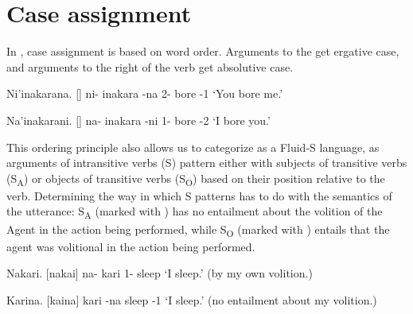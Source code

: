 \section{Case assignment}
	In \kurango , case assignment is based on word order. Arguments to the get ergative case, and arguments to the right of the verb get absolutive case.

	\begin{example}
	\label{ex:case_wordorder_1}
		Ni'inakarana. []
		\gll ni- inakara -na
		2- bore -1
		\glt `You bore me.'
		\glend
	\end{example}

	\begin{example}
	\label{ex:case_wordorder_2}
		Na'inakarani. [\textipa{naPinakaRani}]
		\gll na- inakara -ni
		1- bore -2
		\glt `I bore you.'
		\glend
	\end{example}

	This ordering principle also allows us to categorize {\kurango} as a Fluid-S language, as arguments of intransitive verbs (S) pattern either with subjects of transitive verbs (S\textsubscript{A}) or objects of transitive verbs (S\textsubscript{O}) based on their position relative to the verb. Determining the way in which S patterns has to do with the semantics of the utterance: S\textsubscript{A} (marked with {}) has no entailment about the volition of the Agent in the action being performed, while S\textsubscript{O} (marked with {}) entails that the agent was volitional in the action being performed.

	\begin{example}
	\label{ex:case_erg}
		Nakari. [naka\R i]
		\gll na- kari
		1- sleep
		\glt `I sleep.' (by my own volition.)
		\glend
	\end{example}

	\begin{example}
	\label{ex:case_abs}
		Karina. [ka\R ina]
		\gll kari -na
		sleep -1
		\glt `I sleep.' (no entailment about my volition.)
		\glend
	\end{example}

